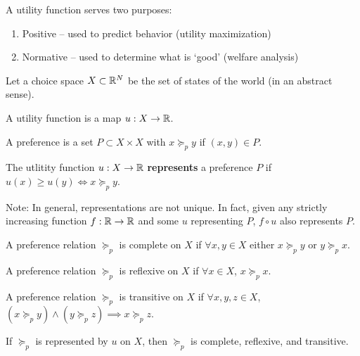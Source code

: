 A utility function serves two purposes:

\begin{enumerate}
\item Positive -- used to predict behavior (utility maximization)
\item Normative -- used to determine what is `good' (welfare analysis)
\end{enumerate}

\begin{definition}
  Let a choice space $X \subset {\mathbb R}^N$ be the set of states of
  the world (in an abstract sense).
\end{definition}


\begin{definition}
  A utility function is a map $u: X \to {\mathbb R}$.
\end{definition}

\begin{definition}[Preference]
  A preference is a set $P \subset X \times X$ with $x \succeq_p y$ if
  $(x,y) \in P$.
\end{definition}

\begin{definition}
  The utlitity function $u: X \to {\mathbb R}$ \textbf{represents} a preference
  $P$ if $u(x) \geq u(y) \iff x \succeq_p y$.
\end{definition}

Note: In general, representations are not unique. In fact, given any
strictly increasing function $f: {\mathbb R} \to {\mathbb R}$ and some $u$ representing
$P$, $f \circ u$ also represents $P$.

\begin{definition}[Complete]
  A preference relation $\succeq_p$ is complete on $X$ if $\forall x,y
  \in X$ either $x \succeq_p y$ or $y \succeq_p x$.
\end{definition}

\begin{definition}[Reflexive]
  A preference relation $\succeq_p$ is reflexive on $X$ if $\forall x
  \in X$, $x \succeq_p x$.
\end{definition}

\begin{definition}[Transitive]
  A preference relation $\succeq_p$ is transitive on $X$ if $\forall
  x,y,z \in X$, $(x \succeq_p y) \wedge (y \succeq_p z) \implies x
  \succeq_p z$.
\end{definition}

\begin{prop}
  If $\succeq_p$ is represented by $u$ on $X$, then $\succeq_p$ is
  complete, reflexive, and transitive.
\end{prop}


